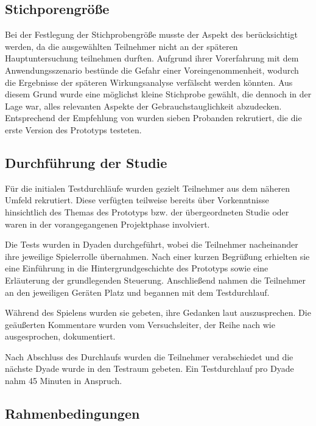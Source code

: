 \subsection{Stichporengröße}\label{sec:pre-study-sample}

Bei der Festlegung der Stichprobengröße musste der Aspekt des  berücksichtigt werden, da die ausgewählten Teilnehmer nicht an der späteren Hauptuntersuchung teilnehmen durften. Aufgrund ihrer Vorerfahrung mit dem Anwendungsszenario bestünde die Gefahr einer Voreingenommenheit, wodurch die Ergebnisse der späteren Wirkungsanalyse verfälscht werden könnten. Aus diesem Grund wurde eine möglichst kleine Stichprobe gewählt, die dennoch in der Lage war, alles relevanten Aspekte der Gebrauchstauglichkeit abzudecken. Entsprechend der Empfehlung von \citet[S. 3088]{karwowski_determining_2006} wurden sieben Probanden rekrutiert, die die erste Version des Prototyps testeten.

\subsection{Durchführung der Studie}

Für die initialen Testdurchläufe wurden gezielt Teilnehmer aus dem näheren Umfeld rekrutiert. Diese verfügten teilweise bereits über Vorkenntnisse hinsichtlich des Themas des Prototyps bzw. der übergeordneten Studie oder waren in der vorangegangenen Projektphase involviert.

Die Tests wurden in Dyaden durchgeführt, wobei die Teilnehmer nacheinander ihre jeweilige Spielerrolle übernahmen. Nach einer kurzen Begrüßung erhielten sie eine Einführung in die Hintergrundgeschichte des Prototyps sowie eine Erläuterung der grundlegenden Steuerung. Anschließend nahmen die Teilnehmer an den jeweiligen Geräten Platz und begannen mit dem Testdurchlauf.

Während des Spielens wurden sie gebeten, ihre Gedanken laut auszusprechen. Die geäußerten Kommentare wurden vom Versuchsleiter, der Reihe nach wie ausgesprochen, dokumentiert.

Nach Abschluss des Durchlaufs wurden die Teilnehmer verabschiedet und die nächste Dyade wurde in den Testraum gebeten. Ein Testdurchlauf pro Dyade nahm 45 Minuten in Anspruch.

\subsection{Rahmenbedingungen}\label{sec:pre-study-rahmen}

